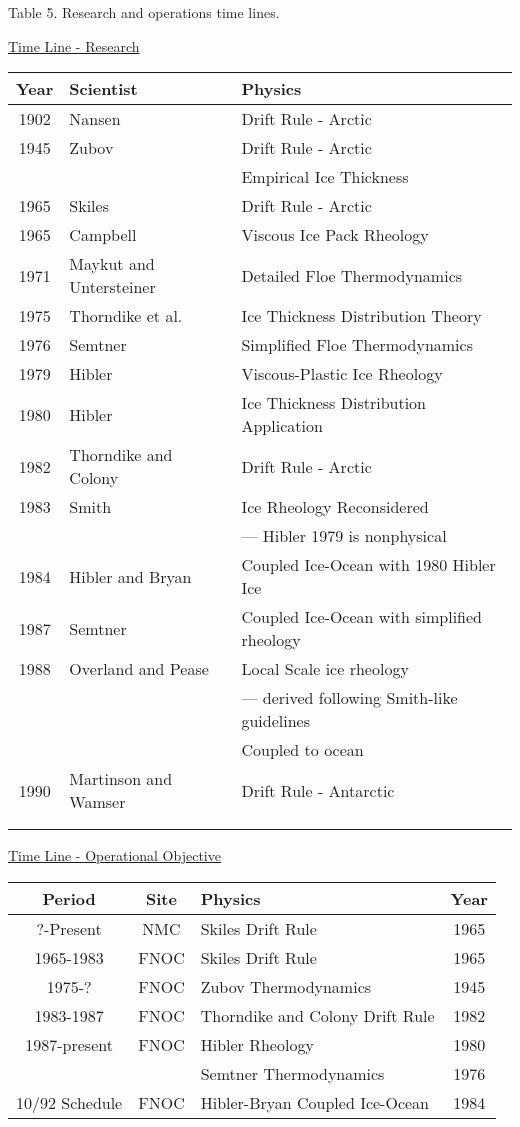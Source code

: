 \pagebreak
\begin{center}
Table 5.  Research and operations time lines.

\underline{Time Line - Research}
\begin{tabular}{cll}
Year & Scientist & Physics \\
\hline
\hline
1902 & Nansen & Drift Rule - Arctic \\
1945 & Zubov & Drift Rule - Arctic \\
&& Empirical Ice Thickness \\
1965 & Skiles & Drift Rule - Arctic \\
1965 & Campbell & Viscous Ice Pack Rheology \\
1971 & Maykut and Untersteiner & Detailed Floe Thermodynamics \\
1975 & Thorndike et al. & Ice Thickness Distribution Theory \\
1976 & Semtner & Simplified Floe Thermodynamics \\
1979 & Hibler & Viscous-Plastic Ice Rheology\\
1980 & Hibler & Ice Thickness Distribution Application \\
1982 & Thorndike and Colony & Drift Rule - Arctic \\
1983 & Smith & Ice Rheology Reconsidered \\
&& --- Hibler 1979 is nonphysical\\
1984 & Hibler and Bryan & Coupled Ice-Ocean with 1980 Hibler Ice \\
1987 & Semtner & Coupled Ice-Ocean with simplified rheology \\
1988 & Overland and Pease & Local Scale ice rheology\\ 
&& --- derived following Smith-like guidelines\\
&& Coupled to ocean \\
1990 & Martinson and Wamser & Drift Rule - Antarctic \\
\hline
&&\\
&&\\
\end{tabular}


\underline{Time Line - Operational Objective}
\begin{tabular}{cclc}
Period & Site & Physics& Year \\
\hline
\hline
?-Present & NMC & Skiles Drift Rule & 1965\\
1965-1983 & FNOC & Skiles Drift Rule & 1965 \\
1975-?    & FNOC & Zubov Thermodynamics & 1945 \\
1983-1987 & FNOC & Thorndike and Colony Drift Rule & 1982 \\
1987-present & FNOC & Hibler Rheology & 1980\\
&&                    Semtner Thermodynamics & 1976\\
10/92 Schedule & FNOC & Hibler-Bryan Coupled Ice-Ocean & 1984 \\
\hline

\end{tabular}
\end{center}



